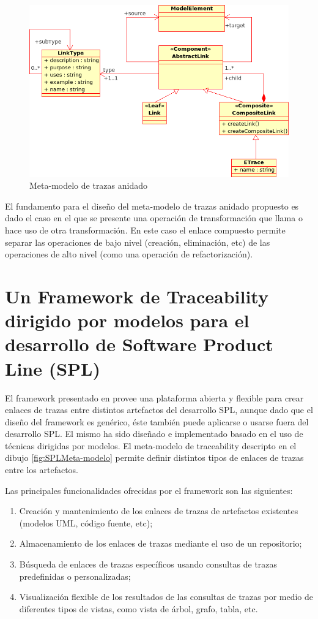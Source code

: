 \documentclass[a4paper,12pt,oneside]{book}
\begin{document}
\begin{figure}[hbtp]
\centering
\includegraphics[scale=0.6]{./img/NestedTraceMetamodel}
\caption{Meta-modelo de trazas anidado}
\label{fig:ETraceToolMeta-modelo}
\end{figure}

El fundamento para el diseño del meta-modelo de trazas anidado propuesto es dado el caso en el que se presente una operación de transformación que llama o hace uso de otra transformación. En este caso el enlace compuesto permite separar las operaciones de bajo nivel (creación, eliminación, etc) de las operaciones de alto nivel (como una operación de refactorización).

\section{Un Framework  de Traceability dirigido por modelos para el desarrollo de Software Product Line (SPL)}

El framework presentado en \cite{SousaKuleszaRummlerAnquetilMitschkeMoreiraAmaralAraujo}  provee una plataforma abierta y flexible para crear enlaces de trazas entre distintos artefactos del desarrollo SPL, aunque dado que el diseño del framework es genérico, éste también puede aplicarse o usarse fuera del desarrollo SPL. El mismo ha sido diseñado e implementado basado en el uso de técnicas dirigidas por modelos. El meta-modelo de traceability descripto en el dibujo \ref{fig:SPLMeta-modelo} permite definir distintos tipos de enlaces de trazas entre los artefactos.

Las principales funcionalidades ofrecidas por el framework son las siguientes:

\begin{enumerate}
\item     Creación y mantenimiento de los enlaces de trazas de artefactos existentes (modelos UML, código fuente, etc);
\item    Almacenamiento de los enlaces de trazas mediante el uso de un repositorio;
\item    Búsqueda de enlaces de trazas específicos usando consultas de trazas predefinidas o personalizadas;
\item    Visualización flexible de los resultados de las consultas de trazas por medio de diferentes tipos de vistas, como vista de árbol, grafo, tabla, etc.
\end{enumerate}
\end{document}
